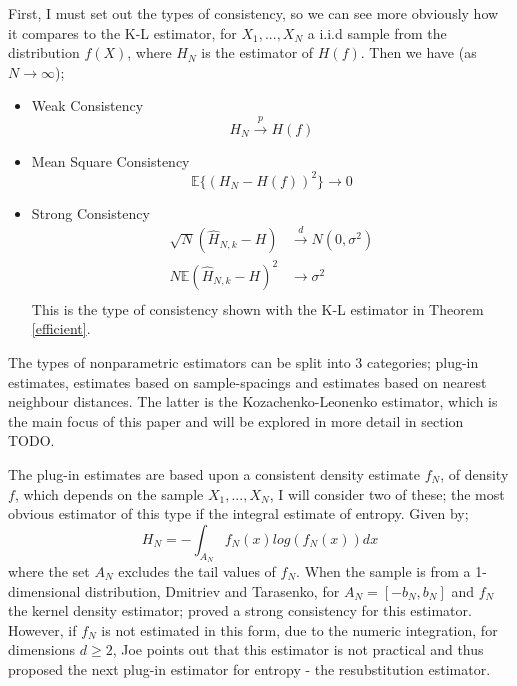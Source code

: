 \documentclass{article}
\begin{document}
First, I must set out the types of consistency, so we can see more obviously how it compares to the K-L estimator, for $X_{1}, ..., X_{N}$ a i.i.d sample from the distribution $f(X)$, where $H_{N}$ is the estimator of $H(f)$. Then we have (as $N \to \infty$);
\begin{itemize}
\item Weak Consistency 
\begin{equation}
H_{N} \xrightarrow{p} H(f)
\end{equation}

\item Mean Square Consistency
\begin{equation}
\mathbb{E}\{(H_{N} - H(f))^2\} \to 0
\end{equation}

\item Strong Consistency
\begin{align}
\sqrt{N}(\hat{H}_{N, k} - H) &\xrightarrow{d} N(0, \sigma^2) \\
N \mathbb{E}{(\hat{H}_{N, k} - H)^2} &\xrightarrow{} \sigma^2 \\ \nonumber
\end{align}
This is the type of consistency shown with the K-L estimator in Theorem \ref{efficient}.

\end{itemize}

The types of nonparametric estimators can be split into 3 categories; plug-in estimates, estimates based on sample-spacings and estimates based on nearest neighbour distances. The latter is the Kozachenko-Leonenko estimator, which is the main focus of this paper and will be explored in more detail in section TODO.

The plug-in estimates are based upon a consistent density estimate $f_{N}$, of density $f$, which depends on the sample $X_{1}, ..., X_{N}$, I will consider two of these; the most obvious estimator of this type if the integral estimate of entropy. Given by;
\begin{equation}
H_{N} = - \int_{A_{N}} f_{N}(x) log ( f_{N}(x) )dx
\end{equation}
where the set $A_{N}$ excludes the tail values of $f_{N}$. When the sample is from a 1-dimensional distribution, Dmitriev and Tarasenko, \cite{intest1} for $A_{N} = [-b_{N}, b_{N}]$ and $f_{N}$ the kernel density estimator; proved a strong consistency for this estimator. However, if $f_{N}$ is not estimated in this form, due to the numeric integration, for dimensions $d \geq 2$, Joe \cite{intest2} points out that this estimator is not practical and thus proposed the next plug-in estimator for entropy - the resubstitution estimator.
\end{document}
